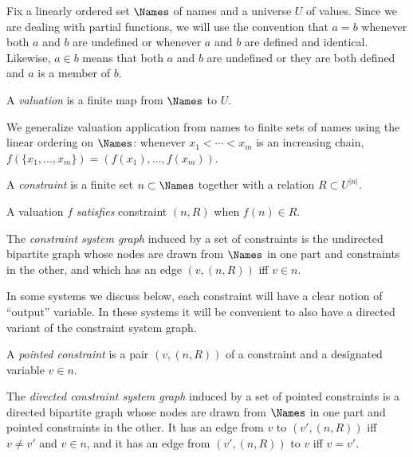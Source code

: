 Fix a linearly ordered set $\Names$ of names and a universe $U$ of values.
Since we are dealing with partial functions, we will use the convention that
$a = b$ whenever both $a$ and $b$ are undefined or whenever $a$ and $b$ are
defined and identical. Likewise, $a \in b$ means that both $a$ and $b$ are
undefined or they are both defined and $a$ is a member of $b$.

\begin{definition}
    A \emph{valuation} is a finite map from $\Names$ to $U$.
\end{definition}

We generalize valuation application from names to finite sets of names using
the linear ordering on $\Names$: whenever $x_1 < \cdots < x_m$ is an
increasing chain, $f(\{x_1,\ldots,x_m\}) = (f(x_1),\ldots,f(x_m))$.

\begin{definition}
    A \emph{constraint} is a finite set $n \subset \Names$ together with a
    relation $R \subset U^{|n|}$.
\end{definition}

\begin{definition}
    A valuation $f$ \emph{satisfies} constraint $(n,R)$ when $f(n) \in R$.
\end{definition}

\begin{definition}
    The \emph{constraint system graph} induced by a set of constraints is
    the undirected bipartite graph whose nodes are drawn from $\Names$ in
    one part and constraints in the other, and which has an edge $(v,(n,R))$
    iff $v \in n$.
\end{definition}

In some systems we discuss below, each constraint will have a clear notion
of ``output'' variable. In these systems it will be convenient to also have
a directed variant of the constraint system graph.

\begin{definition}
    A \emph{pointed constraint} is a pair $(v,(n,R))$ of a constraint and a
    designated variable $v\in n$.
\end{definition}

\begin{definition}
    The \emph{directed constraint system graph} induced by a set of pointed
    constraints is a directed bipartite graph whose nodes are drawn from
    $\Names$ in one part and pointed constraints in the other. It has an
    edge from $v$ to $(v',(n,R))$ iff $v \ne v'$ and $v \in n$, and it has
    an edge from $(v',(n,R))$ to $v$ iff $v=v'$.
\end{definition}

